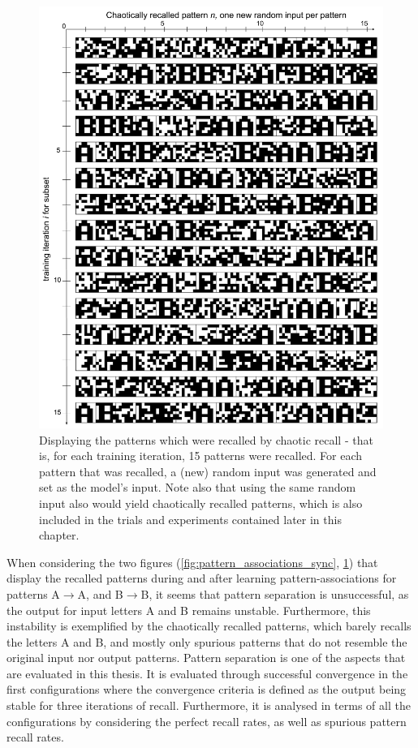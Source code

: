 \begin{figure}
    \centering
    \includegraphics[width=12cm]{fig/AB-chaotic-recall-sync-tm0-dgw25}
    \caption{Displaying the patterns which were recalled by chaotic recall - that is, for each training iteration, 15 patterns were recalled. For each pattern that was recalled, a (new) random input was generated and set as the model's input. Note also that using the same random input also would yield chaotically recalled patterns, which is also included in the trials and experiments contained later in this chapter.}
    \label{fig:chaotic_recall_sync}
\end{figure}

When considering the two figures (\ref{fig:pattern_associations_sync}, \ref{fig:chaotic_recall_sync}) that display the recalled patterns during and after learning pattern-associations for patterns A$\rightarrow$A, and B$\rightarrow$B, it seems that pattern separation is unsuccessful, as the output for input letters A and B remains unstable. Furthermore, this instability is exemplified by the chaotically recalled patterns, which barely recalls the letters A and B, and mostly only spurious patterns that do not resemble the original input nor output patterns. Pattern separation is one of the aspects that are evaluated in this thesis. It is evaluated through successful convergence in the first configurations where the convergence criteria is defined as the output being stable for three iterations of recall. Furthermore, it is analysed in terms of all the configurations by considering the perfect recall rates, as well as spurious pattern recall rates.

